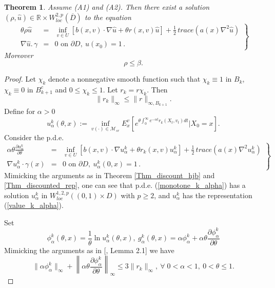 \documentclass[11pt]{amsart}
\newtheorem{theorem}{\bf Theorem}[section]
\numberwithin{equation}{section}
\begin{document}
\begin{theorem}\label{rho < beta}
Assume (A1) and (A2).  Then there exist a solution 
$(\rho, \hat u) \in \mathbb{R} \times W^{2,p}_{loc} (\overline{D })$  to the equation  
\begin{equation}
\left.
\begin{array}{rcl}\label{ergodic}
 \theta \rho \hat u &=& \displaystyle{ \inf_{v \in U} \left[ b(x,v)\cdot  \nabla \hat u + 
\theta r(x,v)\hat u \right] +\frac{1}{2}\, trace (a(x)\nabla^2 \hat u) } \\
\displaystyle{ \nabla \hat u. \, \gamma } &=& 0 \mbox{ on } \partial D, \ 
 \hat u(x_0)=1 \, .
\end{array}
\right\}
\end{equation}
Moreover $$
\rho\leq \beta.
$$
\end{theorem}
\begin{proof} Let $\chi_k$ denote a nonnegative smooth function such that $\chi_k \equiv 1 $ in $B_k$,
$\chi_k \equiv 0$ in $B^c_{k+1}$ and $0\leq \chi_k \leq 1$. Let $r_k=r\chi_k$. Then 
$$
\|r_k\|_{\infty} \leq \| r\|_{\infty, B_{k+1}}.
$$ 
Define for $\alpha >0$ 
\begin{equation}\label{value_k_alpha}
u^k_{\alpha}(\theta,x):=\inf_{v(\cdot)\in \mathcal M_{sr} } E^v_x\left[ e^{\theta\int_{0}^{\infty} e^{-\alpha t} r_k(X_t,v_t) dt} \Big| X_0 =x \right].  
\end{equation}
Consider the p.d.e.
\begin{equation}
\left.
\begin{array}{rcl}\label{monotone_k_alpha}
 \alpha \theta \frac{\partial u^k_{\alpha} }{\partial \theta} &=& \displaystyle{ \inf_{v \in U} \left[ b(x,v)\cdot  \nabla u^k_{\alpha} + \theta
 r_k(x,v) u^k_{\alpha} \right] +\frac{1}{2}\, trace (a(x)\nabla^2 u^k_{\alpha}) } \\
\displaystyle{ \nabla  u^k_{\alpha}\cdot \gamma(x) } &=& 0 \mbox{ on } \partial D, \ 
 u^k_{\alpha}(0, x)=1 \, .
\end{array}
\right\}
\end{equation}   
Mimicking the arguments as in Theorem \ref{Thm_discount_hjb} and \ref{Thm_discounted_rep}, one can see that p.d.e. (\ref{monotone_k_alpha}) has a solution $u^k_{\alpha}$ in $W^{1,2,p}_{loc}((0,1)\times D)$ with $p\geq 2$, and $u^k_{\alpha}$ has the representation (\ref{value_k_alpha}). %

Set 
\begin{equation}\label{monotone_transformation}
\phi^k_{\alpha}(\theta,x)= \frac{1}{\theta} \ln u^k_{\alpha}(\theta,x), \ g^k_{\alpha}(\theta,x)=
 \alpha \phi^k_{\alpha}  + \alpha\theta\frac{\partial \phi^k_{\alpha}}{\partial \theta} 
\end{equation}
Mimicking the arguments as in [\cite{anup_borkar_suresh},  Lemma 2.1] we have 
\begin{equation}\label{monotone_alpha1}
\| \alpha \phi^k_{\alpha} \|_{\infty} + \left\|\alpha\theta\frac{\partial \phi^k_{\alpha}}{\partial \theta}\right\|_{\infty}
\leq 3 \|r_k\|_{\infty},  \ \forall\; 0<\alpha<1,\ 0<\theta \leq 1.
\end{equation}


\end{proof}
\end{document}
